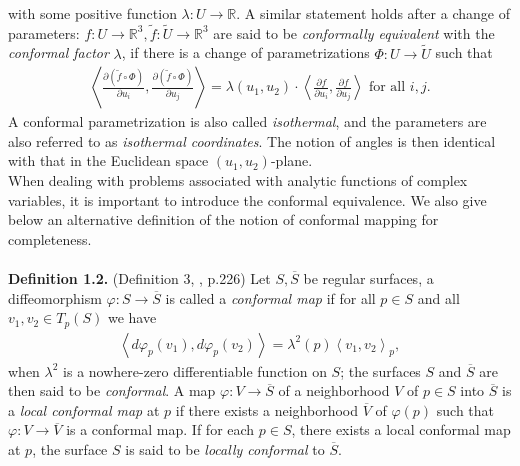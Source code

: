 \documentclass[a4paper]{article}
\numberwithin{equation}{section}
\begin{document}
with some positive function $\lambda :U\to \mathbb{R}$. A similar statement holds after a change of parameters: $f:U\to \mathbb{R}^3, \widetilde{f}:\widetilde{U}\to \mathbb{R}^3$ are said to be \textit{conformally equivalent} with the \textit{conformal factor} $\lambda$, if there is a change of parametrizations $\Phi :U \to \widetilde U$ such that 
\begin{align}
\left\langle {\frac{{\partial \left( {\widetilde f \circ \Phi } \right)}}{{\partial {u_i}}},\frac{{\partial \left( {\widetilde f \circ \Phi } \right)}}{{\partial {u_j}}}} \right\rangle  = \lambda \left( {{u_1},{u_2}} \right) \cdot \left\langle {\frac{{\partial f}}{{\partial {u_i}}},\frac{{\partial f}}{{\partial {u_j}}}} \right\rangle \mbox{ for all } i,j.
\end{align}
A conformal parametrization is also called \textit{isothermal}, and the parameters are also referred to as \textit{isothermal coordinates}. The notion of angles is then identical with that in the Euclidean space $\left(u_1,u_2\right)$-plane.\\

When dealing with problems associated with analytic functions of complex variables, it is important to introduce the conformal equivalence. We also give below an alternative definition of the notion of conformal mapping for completeness.\\
\\
\textbf{Definition 1.2.} (Definition 3, \cite{2}, p.226) Let $S,\overline{S}$ be regular surfaces, a diffeomorphism $\varphi: S\to \overline{S}$ is called a \textit{conformal map} if for all $p\in S$ and all $v_1,v_2\in T_p\left(S\right)$ we have
\begin{align}
\label{1.5}
\left\langle {d{\varphi _p}\left( {{v_1}} \right),d{\varphi _p}\left( {{v_2}} \right)} \right\rangle  = {\lambda ^2}\left( p \right){\left\langle {{v_1},{v_2}} \right\rangle _p},
\end{align}
when $\lambda ^2$ is a nowhere-zero differentiable function on $S$; the surfaces $S$ and $\overline{S}$ are then said to be \textit{conformal}. A map $\varphi:V\to \overline{S}$  of a neighborhood $V$ of $p\in S$ into $\overline{S}$ is a \textit{local conformal map} at $p$ if there exists a neighborhood $\overline{V}$ of $\varphi \left(p\right)$ such that $\varphi :V\to \overline{V}$ is a conformal map. If for each $p\in S$, there exists a local conformal map at $p$, the surface $S$ is said to be \textit{locally conformal} to $\overline{S}$.\\
\end{document}
